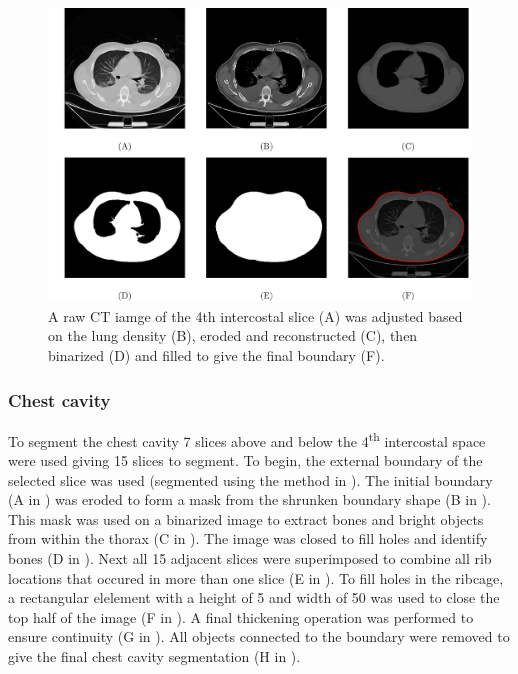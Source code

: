 \begin{figure}
	\centering
	\includegraphics[width=\textwidth]{chapter5-CT_to_mesh/imgs/boundary_seg_methods.pdf}
	\caption[Boundary segmentation methods.]{\label{fig:ext_seg_methods}%
	A raw CT iamge of the 4th intercostal slice (A) 
	was adjusted based on the lung density (B), 
	eroded and reconstructed (C), then binarized (D) and 
	filled to give the final boundary (F).
	}
\end{figure}

\subsubsection{Chest cavity}
To segment the chest cavity 7 slices above and below the 4\textsuperscript{th}
intercostal space were used giving 15 slices to segment. 
To begin, the external boundary of the selected slice was
used (segmented using the method in ). 
The initial boundary 
(A in )
was eroded to form a mask from the shrunken boundary shape
(B in ).
This mask was used on a binarized image to extract bones and bright objects from
within the thorax 
(C in ).
The image was closed to fill  holes and identify bones
(D in ).
Next all 15 adjacent slices were superimposed to combine all rib locations
that occured in more than one slice
(E in ).
To fill holes in the ribcage, a rectangular 
elelement with a height of 5 and width of 50 was used to close 
the top half of the image
(F in ).
A final thickening operation was performed to ensure continuity
(G in ).
All objects connected to the boundary were removed 
to give the final chest cavity segmentation
(H in ).

